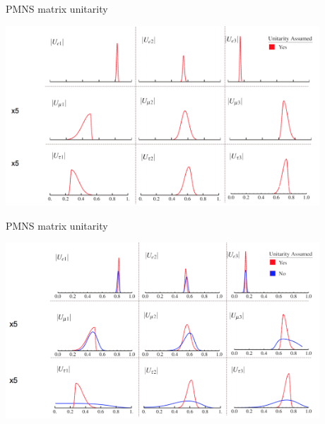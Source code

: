 %
%
%

\begin{frame}{PMNS matrix unitarity}

    \begin{center}
      \includegraphics[width=0.88\textwidth]{./images/osc101/upmns_unitarity}\\
    \end{center}

\end{frame}

%
%
%

\begin{frame}{PMNS matrix unitarity}

    \begin{center}
      \includegraphics[width=0.88\textwidth]{./images/osc101/upmns_no_unitarity}\\
    \end{center}

\end{frame}

%
%
%

